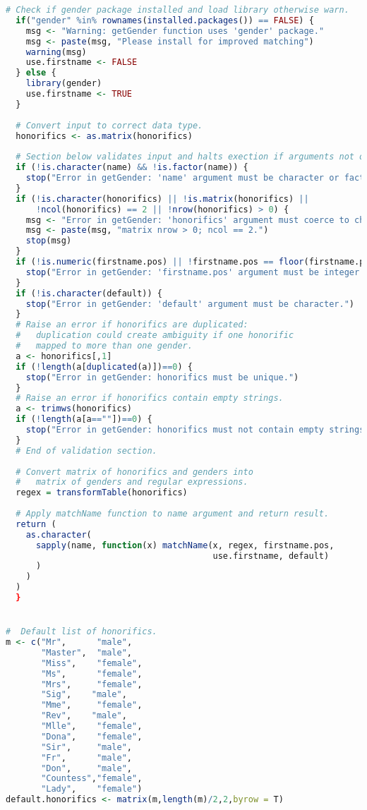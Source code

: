 \documentclass[a4paper, 11pt]{article}
\begin{document}
\begin{appendices}
\begin{lstlisting}[basicstyle=\small,language=R,showstringspaces=false]
  # Check if gender package installed and load library otherwise warn.
  if("gender" %in% rownames(installed.packages()) == FALSE) {
    msg <- "Warning: getGender function uses 'gender' package."
    msg <- paste(msg, "Please install for improved matching")
    warning(msg)
    use.firstname <- FALSE
  } else {
    library(gender)
    use.firstname <- TRUE
  }
  
  # Convert input to correct data type.
  honorifics <- as.matrix(honorifics)
  
  # Section below validates input and halts exection if arguments not of correct type.
  if (!is.character(name) && !is.factor(name)) {
    stop("Error in getGender: 'name' argument must be character or factor.")
  }
  if (!is.character(honorifics) || !is.matrix(honorifics) || 
      !ncol(honorifics) == 2 || !nrow(honorifics) > 0) {
    msg <- "Error in getGender: 'honorifics' argument must coerce to character"
    msg <- paste(msg, "matrix nrow > 0; ncol == 2.")
    stop(msg)
  }
  if (!is.numeric(firstname.pos) || !firstname.pos == floor(firstname.pos)) {
    stop("Error in getGender: 'firstname.pos' argument must be integer.")
  }
  if (!is.character(default)) {
    stop("Error in getGender: 'default' argument must be character.")
  }
  # Raise an error if honorifics are duplicated:
  #   duplication could create ambiguity if one honorific 
  #   mapped to more than one gender.
  a <- honorifics[,1]
  if (!length(a[duplicated(a)])==0) {
    stop("Error in getGender: honorifics must be unique.")
  }
  # Raise an error if honorifics contain empty strings.
  a <- trimws(honorifics)
  if (!length(a[a==""])==0) {
    stop("Error in getGender: honorifics must not contain empty strings.")
  }
  # End of validation section.
  
  # Convert matrix of honorifics and genders into 
  #   matrix of genders and regular expressions.
  regex = transformTable(honorifics)
  
  # Apply matchName function to name argument and return result.
  return (
    as.character(
      sapply(name, function(x) matchName(x, regex, firstname.pos, 
                                         use.firstname, default)
      )
    )
  )
  }


#  Default list of honorifics.
m <- c("Mr",      "male",
       "Master",  "male",
       "Miss",    "female",
       "Ms",      "female",
       "Mrs",     "female",
       "Sig",    "male",
       "Mme",     "female",
       "Rev",    "male",
       "Mlle",    "female",
       "Dona",    "female",
       "Sir",     "male",
       "Fr",      "male",
       "Don",     "male",
       "Countess","female",
       "Lady",    "female")
default.honorifics <- matrix(m,length(m)/2,2,byrow = T)



\end{lstlisting}
\end{appendices}
\end{document}
